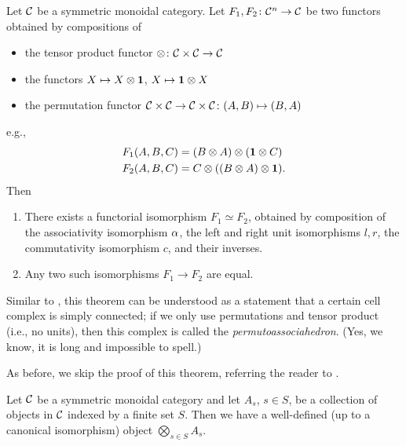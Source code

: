 \begin{theorem}\label{t:maclane-symmetric}\par

  \noindent
  Let $\mathcal{C}$ be a symmetric monoidal category. Let $F_1, F_2\colon \mathcal{C}^n\to
  \mathcal{C}$ be two functors obtained by compositions of
  \begin{itemize}
    \item the tensor product functor $\otimes\colon \mathcal{C}\times \mathcal{C}\to \mathcal{C}$
    \item the functors $X\mapsto X\otimes \mathbf{1}$, $X\mapsto \mathbf{1} \otimes X$
    \item the permutation functor $\mathcal{C}\times \mathcal{C} \to \mathcal{C}\times \mathcal{C}
          \colon (A, B)\mapsto (B,A)$
  \end{itemize}
  e.g.,
  \begin{align*}
    F_1(A,B,C)&=(B\otimes A)\otimes (\mathbf{1}\otimes C)\\
    F_2(A,B,C)&=C\otimes ((B\otimes  A)\otimes \mathbf{1}).
  \end{align*}
  Then
  \begin{enumerate}
    \item There exists a functorial isomorphism $F_1\simeq F_2$, obtained
      by composition of the associativity isomorphism $\alpha$, the left and right
      unit isomorphisms $l,r$, the commutativity isomorphism $c$, and their
      inverses.
    \item Any two such isomorphisms $F_1\to F_2$ are equal.
  \end{enumerate}
\end{theorem}
Similar to , this theorem can be understood as a statement
that a certain cell complex is simply connected; if we only use
permutations and tensor product (i.e., no units), then this complex is
called the \emph{permutoassociahedron}. (Yes, we know, it is long and
impossible to spell.)


As before, we skip the proof of this theorem, referring the reader to
\cite[Section XI.1]{mac-lane}.

\begin{corollary}\label{c:AS}
  Let $\mathcal{C}$ be a symmetric monoidal category and let $A_s$, $s\in S$, be a
  collection of objects in $\mathcal{C}$ indexed by a finite set $S$. Then we have a
  well-defined (up to a canonical isomorphism) object $ \bigotimes_{s\in S}
  A_s$.
\end{corollary}

